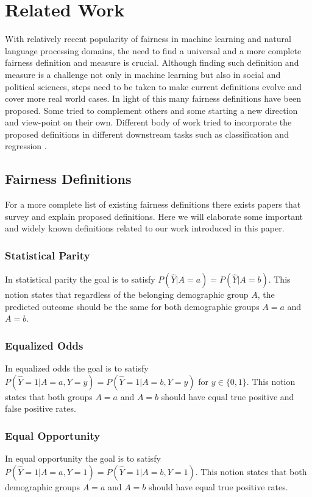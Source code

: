 \section{Related Work}
With relatively recent popularity of fairness in machine learning and natural language processing domains, the need to find a universal and a more complete fairness definition and measure is crucial. Although finding such definition and measure is a challenge not only in machine learning but also in social and political sciences, steps need to be taken to make current definitions evolve and cover more real world cases. In light of this many fairness definitions have been proposed. Some tried to complement others and some starting a new direction and view-point on their own. Different body of work tried to incorporate the proposed definitions in different downstream tasks such as classification and regression \cite{pmlr-v81-menon18a,
berk2017convex, Krasanakis:2018:ASR:3178876.3186133, agarwal2019fair,goel2018non}.
  
\subsection{Fairness Definitions}
For a more complete list of existing fairness definitions there exists papers that survey \cite{mehrabi2019survey} and explain \cite{verma2018fairness} proposed definitions. Here we will elaborate some important and widely known definitions related to our work introduced in this paper.

\subsubsection{Statistical Parity} In statistical parity \cite{Dwork:2012:FTA:2090236.2090255} the goal is to satisfy $P(\hat{Y} |A = a) = P(\hat{Y}|A = b)$. This notion states that regardless of the belonging demographic group $A$, the predicted outcome should be the same for both demographic groups $A=a$ and $A=b$.
\subsubsection{Equalized Odds} In equalized odds \cite{hardt2016equality}   the goal is to satisfy  $P(\hat{Y}=1|A=a,Y=y) = P(\hat{Y}=1|A=b,Y=y)$ for $y\in\{0,1\}$. This notion states that both groups $A=a$ and $A=b$ should have equal true positive and false positive rates.
\subsubsection{Equal Opportunity} In equal opportunity \cite{hardt2016equality} the goal is to satisfy $P(\hat{Y}=1|A=a,Y=1) = P(\hat{Y}=1|A=b,Y=1)$. This notion states that both demographic groups $A=a$ and $A=b$ should have equal true positive rates.
